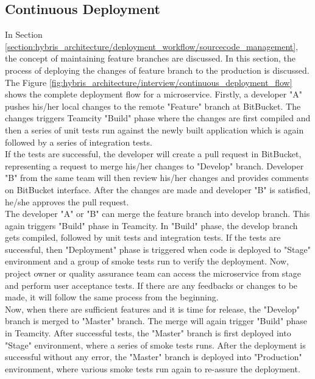 \subsection{Continuous Deployment}\label{section:hybris_architecture/deployment_workflow/continuous_Deployment}
In Section \ref{section:hybris_architecture/deployment_workflow/sourcecode_management}, the concept of maintaining feature branches are discussed. In this section, the process of deploying the changes of feature branch to the production is discussed.\\
The Figure \ref{fig:hybris_architecture/interview/continuous_deployment_flow} shows the complete deployment flow for a microservice. Firstly, a developer "A" pushes his/her local changes to the remote "Feature" branch at BitBucket. The changes triggers Teamcity "Build" phase where the changes are first compiled and then a series of unit tests run against the newly built application which is again followed by a series of integration tests.\\
If the tests are successful, the developer will create a pull request in BitBucket, representing a request to merge his/her changes to "Develop" branch. Developer "B" from the same team will then review his/her changes and provides comments on BitBucket interface. After the changes are made and developer "B" is satisfied, he/she approves the pull request.\\
The developer "A" or "B" can merge the feature branch into develop branch. This again triggers "Build" phase in Teamcity. In "Build" phase, the develop branch gets compiled, followed by unit tests and integration tests. If the tests are successful, then "Deployment" phase is triggered when code is deployed to "Stage" environment and a group of smoke tests run to verify the deployment. Now, project owner or quality assurance team can access the microservice from stage and perform user acceptance tests. If there are any feedbacks or changes to be made, it will follow the same process from the beginning.\\
Now, when there are sufficient features and it is time for release, the "Develop" branch is merged to "Master" branch. The merge will again trigger "Build" phase in Teamcity. After successful tests, the "Master" branch is first deployed into "Stage" environment, where a series of smoke tests runs. After the deployment is successful without any error, the "Master" branch is deployed into "Production" environment, where various smoke tests run again to re-assure the deployment.
